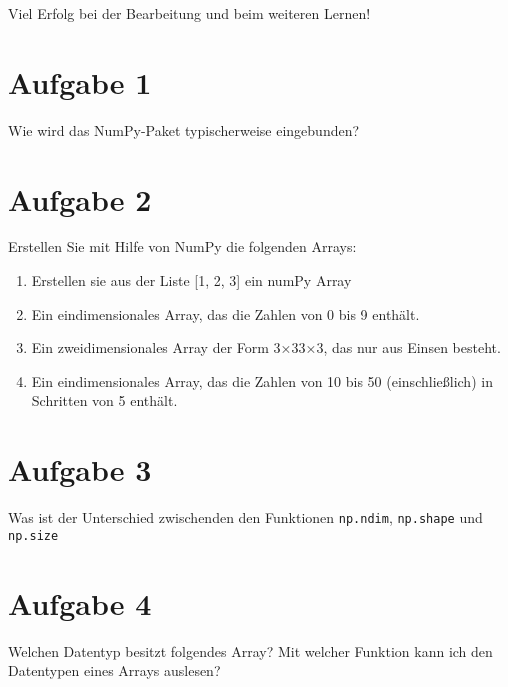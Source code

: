 \documentclass[
  letterpaper,
  DIV=11,
  numbers=noendperiod]{scrreprt}
\providecommand{\tightlist}{%
  \setlength{\itemsep}{0pt}\setlength{\parskip}{0pt}}\usepackage{longtable,booktabs,array}
\begin{document}
\begin{tcolorbox}
Viel Erfolg bei der Bearbeitung und beim weiteren Lernen!

\section*{Aufgabe 1}\label{aufgabe-1}


Wie wird das NumPy-Paket typischerweise eingebunden?

\section*{Aufgabe 2}\label{aufgabe-2}


Erstellen Sie mit Hilfe von NumPy die folgenden Arrays:

\begin{enumerate}
\def\labelenumi{\arabic{enumi}.}
\tightlist
\item
  Erstellen sie aus der Liste {[}1, 2, 3{]} ein numPy Array
\item
  Ein eindimensionales Array, das die Zahlen von 0 bis 9 enthält.
\item
  Ein zweidimensionales Array der Form 3×33×3, das nur aus Einsen
  besteht.
\item
  Ein eindimensionales Array, das die Zahlen von 10 bis 50
  (einschließlich) in Schritten von 5 enthält.
\end{enumerate}

\section*{Aufgabe 3}\label{aufgabe-3}


Was ist der Unterschied zwischenden den Funktionen \texttt{np.ndim},
\texttt{np.shape} und \texttt{np.size}

\section*{Aufgabe 4}\label{aufgabe-4}


Welchen Datentyp besitzt folgendes Array? Mit welcher Funktion kann ich
den Datentypen eines Arrays auslesen?


\end{tcolorbox}
\end{document}
